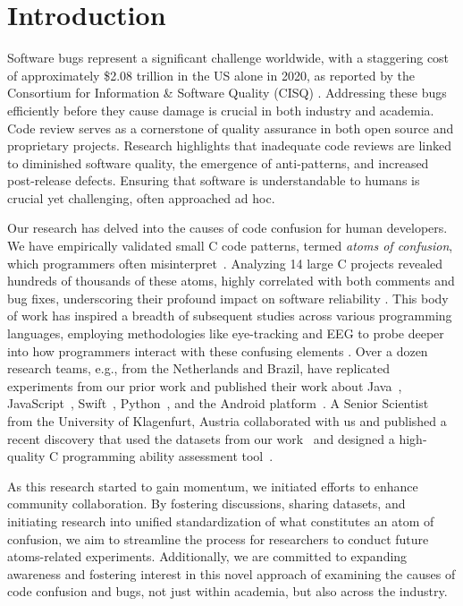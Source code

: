 \documentclass[conference]{IEEEtran}
\begin{document}
\section{Introduction}

Software bugs represent a significant challenge worldwide, 
with a staggering cost of approximately \$2.08 trillion in the 
US alone in 2020, as reported by the Consortium for 
Information \& Software Quality (CISQ) \cite{CPSQ2020}. 
Addressing these bugs efficiently before they cause damage is 
crucial in both industry and academia.
%
Code review serves as a cornerstone of quality assurance in 
both open source and proprietary projects. Research highlights 
that inadequate code reviews are linked to diminished software 
quality, the emergence of anti-patterns, and increased 
post-release defects. %
Ensuring that software is understandable to 
humans is crucial yet challenging, often approached ad hoc.

Our research has delved into the causes of code confusion for 
human developers. We have empirically validated 
small C code patterns, termed \emph{atoms of confusion}, which 
programmers often misinterpret~\cite{gopstein2017understanding}. Analyzing 14 large C projects 
revealed hundreds of thousands of these atoms, highly 
correlated with both comments and bug fixes, underscoring 
their profound impact on software reliability 
\cite{gopstein2018prevalence}.
%
This body of work has inspired a breadth of subsequent studies 
across various programming languages, employing methodologies 
like eye-tracking and EEG to probe deeper into how programmers 
interact with these confusing elements 
\cite{langhout2021atoms, mendes2022dazed, 
torres2023investigation, dacosta2023seeing, 
Manor2018AtomsConfusionSwift, yeh2017detecting}. Over a dozen research teams, e.g., from the Netherlands and Brazil, have replicated experiments from our prior work and published their work about Java~\cite{langhout2021atoms, mendes2022dazed}, JavaScript~\cite{oliveira2019impact},  Swift~\cite{castor2018identifying}, Python~\cite{da2023seeing}, and the Android platform~\cite{tabosa2024dataset}. A Senior Scientist from the University of Klagenfurt, Austria collaborated with us and published a recent discovery that used the datasets from our work~\cite{gopstein2017understanding, zhuang2023developer} and designed a high-quality C programming ability assessment tool~\cite{glasauer2024c}.

As this research started to gain momentum, we initiated 
efforts to enhance community collaboration. By fostering 
discussions, sharing datasets, and initiating research into 
unified standardization of what constitutes an atom of 
confusion, we aim to streamline the process for researchers to 
conduct future atoms-related experiments. Additionally, we are 
committed to expanding awareness and fostering interest in 
this novel approach of examining the causes of code confusion 
and bugs, not just within academia, but also across the 
industry.
\end{document}
